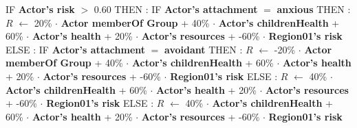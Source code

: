 \documentclass{article}%
\begin{document}
%
\begin{flushleft}%
IF %
\textbf{Actor's risk}%
$>$%
0.60%
\linebreak%
\hspace*{2em}%
THEN %
: %
IF %
\textbf{Actor's attachment}%
$=$%
\textbf{anxious}%
\linebreak%
\hspace*{4em}%
THEN %
: %
$R$%
$\leftarrow$%
20\%%
$\cdot$%
\textbf{Actor memberOf Group}%
+%
40\%%
$\cdot$%
\textbf{Actor's childrenHealth}%
+%
60\%%
$\cdot$%
\textbf{Actor's health}%
+%
20\%%
$\cdot$%
\textbf{Actor's resources}%
+%
{-}60\%%
$\cdot$%
\textbf{Region01's risk}%
\linebreak%
\hspace*{4em}%
ELSE %
: %
IF %
\textbf{Actor's attachment}%
$=$%
\textbf{avoidant}%
\linebreak%
\hspace*{6em}%
THEN %
: %
$R$%
$\leftarrow$%
{-}20\%%
$\cdot$%
\textbf{Actor memberOf Group}%
+%
40\%%
$\cdot$%
\textbf{Actor's childrenHealth}%
+%
60\%%
$\cdot$%
\textbf{Actor's health}%
+%
20\%%
$\cdot$%
\textbf{Actor's resources}%
+%
{-}60\%%
$\cdot$%
\textbf{Region01's risk}%
\linebreak%
\hspace*{6em}%
ELSE %
: %
$R$%
$\leftarrow$%
40\%%
$\cdot$%
\textbf{Actor's childrenHealth}%
+%
60\%%
$\cdot$%
\textbf{Actor's health}%
+%
20\%%
$\cdot$%
\textbf{Actor's resources}%
+%
{-}60\%%
$\cdot$%
\textbf{Region01's risk}%
\linebreak%
\hspace*{2em}%
ELSE %
: %
$R$%
$\leftarrow$%
40\%%
$\cdot$%
\textbf{Actor's childrenHealth}%
+%
60\%%
$\cdot$%
\textbf{Actor's health}%
+%
20\%%
$\cdot$%
\textbf{Actor's resources}%
+%
{-}60\%%
$\cdot$%
\textbf{Region01's risk}%
\end{flushleft}

%
\end{document}
